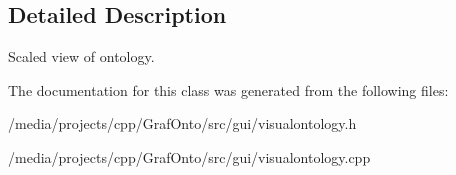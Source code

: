 \subsection{\-Detailed \-Description}
\-Scaled view of ontology. 

\-The documentation for this class was generated from the following files\-:\begin{DoxyCompactItemize}
\item 
/media/projects/cpp/\-Graf\-Onto/src/gui/visualontology.\-h\item 
/media/projects/cpp/\-Graf\-Onto/src/gui/visualontology.\-cpp\end{DoxyCompactItemize}
